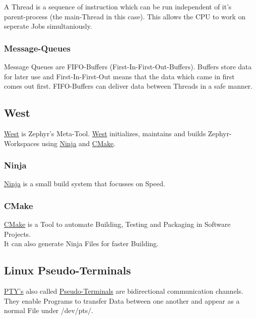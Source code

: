 A Thread is a sequence of instruction which can be run
independent of it's parent-process (the main-Thread in this case).
This allows the CPU to work on seperate Jobs simultaniously.

\subsubsection{Message-Queues}

Message Queues are FIFO-Buffers (First-In-First-Out-Buffers).
Buffers store data for later use and First-In-First-Out means
that the data which came in first comes out first.
FIFO-Buffers can deliver data between Threads in a safe manner.

\pagebreak

\subsection{West}

\href{https://docs.zephyrproject.org/2.4.0/guides/west/index.html}
{West} is Zephyr's Meta-Tool.
\href{https://docs.zephyrproject.org/2.4.0/guides/west/index.html}
{West} initializes, maintains and builds Zephyr-Workspaces
using
\href{https://ninja-build.org/manual.html}
{Ninja} and
\href{https://cmake.org/}
{CMake}.

\subsubsection{Ninja}

\href{https://ninja-build.org/manual.html}
{Ninja} is a small build system that focusses on Speed.

\subsubsection{CMake}

\href{https://cmake.org/}
{CMake} is a Tool to automate Building, Testing and Packaging
in Software Projects.\\
It can also generate Ninja Files for faster Building.

\subsection{Linux Pseudo-Terminals}

\href{https://linux.die.net/man/7/pty}
{PTY's} also called
\href{https://linux.die.net/man/7/pty}
{Pseudo-Terminals} are bidirectional communication channels.
They enable Programs to transfer Data between one another
and appear as a normal File under /dev/pts/.

